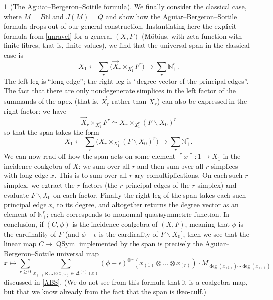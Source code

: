 \documentclass{amsart}
\def\overarrow#1{{\vec{#1}}}
\def\nondeg{\overarrow}
\newcommand{\QSym}{\operatorname{QSym}}
\newcommand{\N}{\mathbb{N}}
\newcommand{\name}[1]{\ulcorner \!#1\! \urcorner}
\theoremstyle{definition}
\theoremstyle{noname}
\newtheorem{blanko}[theorem]{}
\begin{document}
\begin{blanko}[The Aguiar--Bergeron--Sottile formula]
  We finally consider the classical case, where $M=B\N$ and $J(M)=Q$ and show 
  how the Aguiar--Bergeron--Sottile formula drops out of our general construction.
  Instantiating here the explicit formula from  \ref{unravel}
  for a general $(X,F)$ (M\"obius, with zeta function with finite fibres, that is, 
  finite values),
  we find that the universal span in the classical case is
  $$
  X_1 \longleftarrow  \sum_r \big( \nondeg X_r \times_{X_1^r} F^r \big) 
  \longrightarrow 
  \sum_r \N_+^r   .
  $$
  The left leg is ``long edge''; the right leg is ``degree vector of the principal 
  edges''.
  The fact that there are only nondegenerate simplices in the left factor of 
  the
  summands of
  the apex (that is, $\nondeg X_r$ rather than $X_r$) can also be expressed in the right factor: we have
  $$
  \nondeg X_r \times_{X_1^r} F^r \simeq X_r \times_{X_1^r} (F\backslash X_0)^r
  $$
  so that the span takes the form
  $$
  X_1 \longleftarrow  \sum_r \big( X_r \times_{X_1^r} (F\backslash X_0)^r \big) 
  \longrightarrow  
  \sum_r \N_+^r   .
  $$
  We can now read off how the span acts on some element $\name x : 1 \to X_1$ in the 
  incidence coalgebra of $X$:
  we sum over all $r$ and then sum over all $r$-simplices with long edge $x$.
  This is to sum over all $r$-ary comultiplications. On each such $r$-simplex, we 
  extract the $r$ factors (the $r$ principal edges of the $r$-simplex) and evaluate $F\backslash X_0$ on 
  each factor. Finally the right leg of the span takes each such principal edge $x_i$ 
  to its degree, and altogether returns the degree vector as an element of $\N_+^r$;
  each corresponds to monomial quasisymmetric function. In conclusion, if $(C,\phi)$ is
  the incidence coalgebra of $(X,F)$, meaning that $\phi$ is the cardinality of $F$ 
  (and $\phi-\epsilon$ is the cardinality of $F\backslash X_0$), then we see that
  the linear map $C\to \QSym$ implemented by the 
  span is precisely the Aguiar--Bergeron--Sottile universal map
  $$
  x \mapsto \sum_{r\geq 0} \sum_{x_{(1)}\otimes\dots\otimes x_{(r)}\in \Delta^{(r)}(x)}
  (\phi-\epsilon)^{\otimes r}(x_{(1)}\otimes\dots\otimes x_{(r)}) \cdot 
  M_{\deg(x_{(1)})\cdots \deg(x_{(r)})} 
  $$
  discussed in \ref{ABS}.
  (We do not see from this formula that it is a coalgebra map, but that we know 
  already from the fact that the span is ikeo-culf.)
\end{blanko}



\appendix
\end{document}
